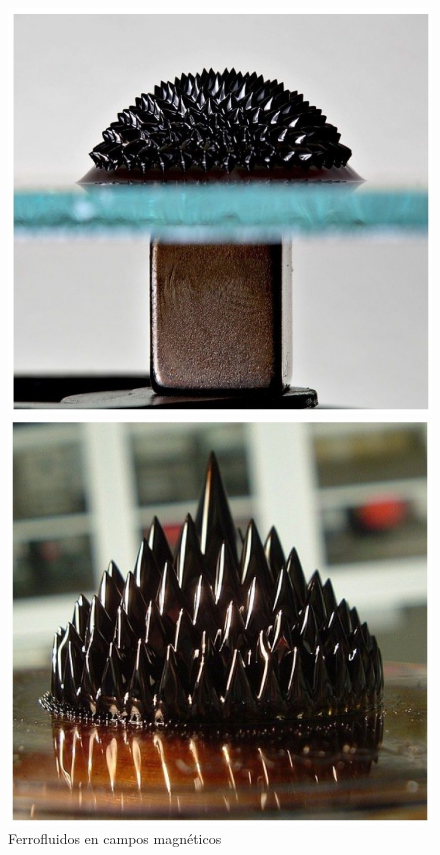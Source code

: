 \begin{figure}[H]
  \begin{minipage}[b]{0.47\textwidth}
     \includegraphics[width=1.10\textwidth]{./Figures/fig30}
  \end{minipage}
  \hfill
  \begin{minipage}[b]{0.47\textwidth}
     \includegraphics[width=1.10\textwidth]{./Figures/fig31}
  \end{minipage}
	\caption{Ferrofluidos en campos magnéticos}
	\label{fig:30}
\end{figure}

